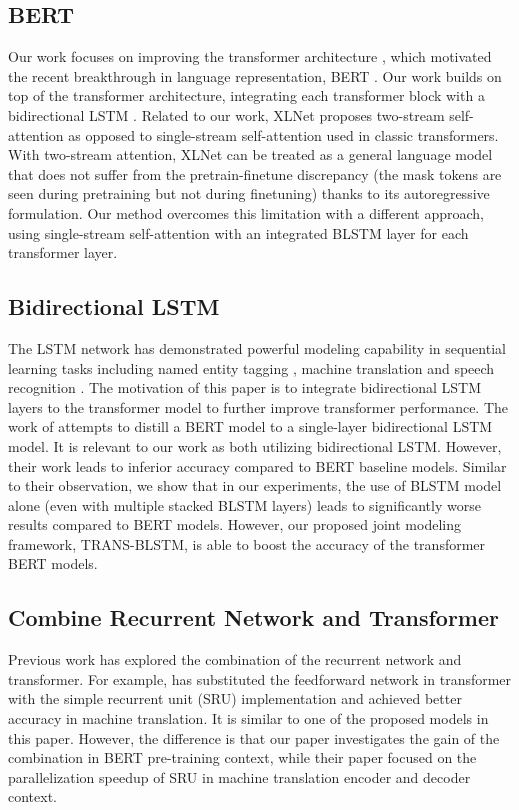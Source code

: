 \documentclass[11pt,a4paper]{article}
\begin{document}
\subsection{BERT}
Our work focuses on improving the transformer architecture \cite{aswani2017}, which motivated the recent breakthrough in language representation, BERT \cite{devlin2018}. Our work builds on top of the transformer architecture, integrating each transformer block with a bidirectional LSTM \cite{sepp1997}. Related to our work, XLNet \cite{yang2019} proposes two-stream self-attention as opposed to single-stream self-attention used in classic transformers. With two-stream attention, XLNet can be treated as a general language model that does not suffer from the pretrain-finetune discrepancy (the mask tokens are seen during pretraining but not during finetuning) thanks to its autoregressive formulation. Our method overcomes this limitation with a different approach, using single-stream self-attention with an integrated BLSTM layer for each transformer layer.

\subsection{Bidirectional LSTM}
The LSTM network \cite{sepp1997} has demonstrated powerful modeling capability in sequential learning tasks including named entity tagging \cite{huang2015,chiu2016}, machine translation \cite{bahdanau2015,wu2016} and speech recognition \cite{graves2013,sak2014}. The motivation of this paper is to integrate bidirectional LSTM layers to the transformer model to further improve transformer performance. The work of \cite{tang2019} attempts to distill a BERT model to a single-layer bidirectional LSTM model. It is relevant to our work as both utilizing bidirectional LSTM. However, their work leads to inferior accuracy compared to BERT baseline models. Similar to their observation, we show that in our experiments, the use of BLSTM model alone (even with multiple stacked BLSTM layers) leads to significantly worse results compared to BERT models. However, our proposed joint modeling framework, TRANS-BLSTM, is able to boost the accuracy of the transformer BERT models. 

\subsection{Combine Recurrent Network and Transformer}
Previous work has explored the combination of the recurrent network and transformer. For example, \cite{	lei2018} has substituted the feedforward network in transformer with the simple recurrent unit (SRU) implementation and achieved better accuracy in machine translation. It is similar to one of the proposed models in this paper. However, the difference is that our paper investigates the gain of the combination in BERT pre-training context, while their paper focused on the parallelization speedup of SRU in machine translation encoder and decoder context. 
\end{document}

